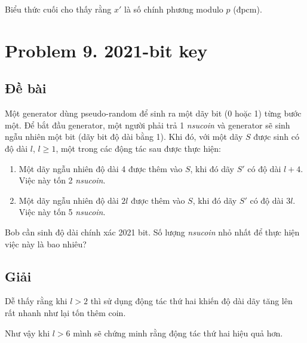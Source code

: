 Biểu thức cuối cho thấy rằng $x'$ là số chính phương modulo $p$ (đpcm).

\section*{Problem 9. 2021-bit key}

\subsection*{Đề bài}

Một generator dùng pseudo-random để sinh ra một dãy bit (0 hoặc 1) từng bước một. Để bắt đầu generator, một người phải trả 1 \textit{nsucoin} và generator sẽ sinh ngẫu nhiên một bit (dãy bit độ dài bằng 1). Khi đó, với một dãy $S$ được sinh có độ dài $l$, $l \geqslant 1$, một trong các động tác sau được thực hiện:

\begin{enumerate}
    \item Một dãy ngẫu nhiên độ dài 4 được thêm vào $S$, khi đó dãy $S'$ có độ dài $l + 4$. Việc này tốn 2 \textit{nsucoin}.
    \item Một dãy ngẫu nhiên độ dài $2l$ được thêm vào $S$, khi đó dãy $S'$ có độ dài $3l$. Việc này tốn 5 \textit{nsucoin}.
\end{enumerate}

Bob cần sinh độ dài chính xác 2021 bit. Số lượng \textit{nsucoin} nhỏ nhất để thực hiện việc này là bao nhiêu?

\subsection*{Giải}

Dễ thấy rằng khi $l > 2$ thì sử dụng động tác thứ hai khiến độ dài dãy tăng lên rất nhanh như lại tốn thêm coin.

Như vậy khi $l > 6$ mình sẽ chứng minh rằng động tác thứ hai hiệu quả hơn.

